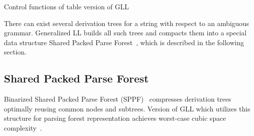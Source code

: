 \begin{algorithm}[ht]
\begin{algorithmic}[1]
\caption{Control functions of table version of GLL}
\label{mainTblFunctions}
  \Else
  \EndIf
\EndFunction

       \Else 
       \EndIf
       \EndIf
  \EndCase
       \EndFor
  \EndCase
  \EndCase
  \EndCase
  \EndSwitch
\EndFunction

      \Else
      \EndIf
  \EndWhile
\EndFunction

\end{algorithmic}
\end{algorithm}

There can exist several derivation trees for a string with respect to an ambiguous grammar.
Generalized LL builds all such trees and compacts them into a special data structure Shared Packed Parse Forest~\cite{SPPF}, which is described in the following section.

\subsection{Shared Packed Parse Forest}

Binarized Shared Packed Parse Forest (SPPF)~\cite{brnglr} compresses derivation trees optimally reusing common nodes and subtrees.
Version of GLL which utilizes this structure for parsing forest representation achieves worst-case cubic space complexity~\cite{gllParsingTree}.

